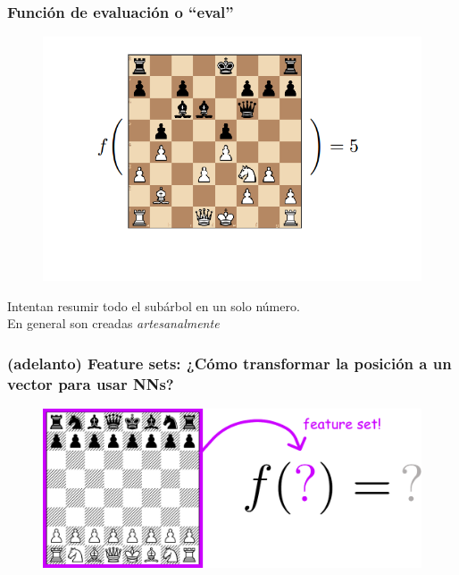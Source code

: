 \begin{frame}
\frametitle{Función de evaluación o \enquote{eval}}
\begin{figure}
    \centering
    \includegraphics[width=0.8\linewidth]{../assets/slides/eval.png}
\end{figure}
\begin{center}
Intentan resumir todo el subárbol en un solo número. \\
En general son creadas \textit{artesanalmente}
\end{center}
\end{frame}

\begin{frame}
\frametitle{(adelanto) Feature sets: ¿Cómo transformar la posición a un vector para usar NNs?}
\begin{figure}
\centering
\includegraphics[width=1.0\linewidth]{../assets/slides/fs_motiv2.pdf}
\end{figure}
\end{frame}

